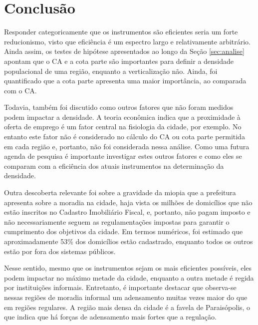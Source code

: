 \chapter{Conclusão}
\label{sec:conclusao}

Responder categoricamente que os instrumentos são eficientes seria um forte reducionismo, visto que eficiência é um espectro largo e relativamente arbitrário. Ainda assim, os testes de hipótese apresentados ao longo da Seção \ref{sec:analise} apontam que o CA e a cota parte são importantes para definir a densidade populacional de uma região, enquanto a verticalização não. Ainda, foi quantificado que a cota parte apresenta uma maior importância, ao comparada com o CA.

Todavia, também foi discutido como outros fatores que não foram medidos podem impactar a densidade. A teoria econômica indica que a proximidade à oferta de emprego é um fator central na fisiologia da cidade, por exemplo. No entanto este fator não é considerado no cálculo do CA ou cota parte permitida em cada região e, portanto, não foi considerada nessa análise. Como uma futura agenda de pesquisa é importante investigar estes outros fatores e como eles se comparam com a eficiência dos atuais instrumentos na determinação da densidade.

Outra descoberta relevante foi sobre a gravidade da miopia que a prefeitura apresenta sobre a moradia na cidade, haja vista os milhões de domicílios que não estão inscritos no Cadastro Imobiliário Fiscal, e, portanto, não pagam imposto e não necessariamente seguem as regulamentações impostas para garantir o cumprimento dos objetivos da cidade. Em termos numéricos, foi estimado que aproximadamente 53\% dos domicílios estão cadastrado, enquanto todos os outros estão por fora dos sistemas públicos.

Nesse sentido, mesmo que os instrumentos sejam os mais eficientes possíveis, eles podem impactar no máximo metade da cidade, enquanto a outra metade é regida por instituições informais. Entretanto, é importante destacar que observa-se nessas regiões de moradia informal um adensamento muitas vezes maior do que em regiões regulares. A região mais densa da cidade é a favela de Paraisópolis, o que indica que há forças de adensamento mais fortes que a regulação.
